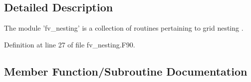 \subsection{Detailed Description}
The module 'fv\-\_\-nesting' is a collection of routines pertaining to grid nesting \cite{harris2013two}. 

Definition at line 27 of file fv\-\_\-nesting.\-F90.



\subsection{Member Function/\-Subroutine Documentation}
